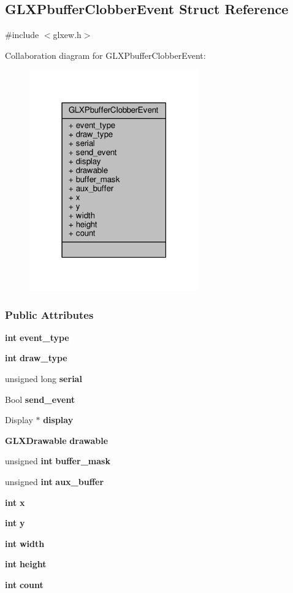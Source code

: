 \subsection{G\+L\+X\+Pbuffer\+Clobber\+Event Struct Reference}
\label{structGLXPbufferClobberEvent}


{\ttfamily \#include $<$glxew.\+h$>$}



Collaboration diagram for G\+L\+X\+Pbuffer\+Clobber\+Event\+:
\nopagebreak
\begin{figure}[H]
\begin{center}
\leavevmode
\includegraphics[width=207pt]{dc/da7/structGLXPbufferClobberEvent__coll__graph}
\end{center}
\end{figure}
\subsubsection*{Public Attributes}
\begin{DoxyCompactItemize}
\item 
{\bf int} {\bf event\+\_\+type}
\item 
{\bf int} {\bf draw\+\_\+type}
\item 
unsigned long {\bf serial}
\item 
Bool {\bf send\+\_\+event}
\item 
Display $\ast$ {\bf display}
\item 
{\bf G\+L\+X\+Drawable} {\bf drawable}
\item 
unsigned {\bf int} {\bf buffer\+\_\+mask}
\item 
unsigned {\bf int} {\bf aux\+\_\+buffer}
\item 
{\bf int} {\bf x}
\item 
{\bf int} {\bf y}
\item 
{\bf int} {\bf width}
\item 
{\bf int} {\bf height}
\item 
{\bf int} {\bf count}
\end{DoxyCompactItemize}


